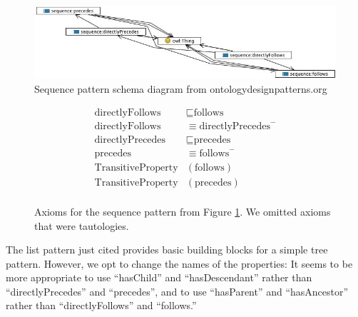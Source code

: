 \begin{figure}[t]
\begin{center}
\includegraphics[width=\textwidth]{sequence.png}
\end{center}
\caption{Sequence pattern schema diagram from ontologydesignpatterns.org}\label{fig:sequence}
\end{figure}

\begin{figure}[t]
\begin{align*}
\text{directlyFollows} &\sqsubseteq  \text{follows}\\
\text{directlyFollows} &\equiv  \text{directlyPrecedes}^- \\
\text{directlyPrecedes} &\sqsubseteq  \text{precedes}\\
\text{precedes} &\equiv  \text{follows}^- \\
\text{TransitiveProperty}&(\text{follows})\\
\text{TransitiveProperty}&(\text{precedes})\\
\end{align*}
\caption{Axioms for the sequence pattern from Figure \ref{fig:sequence}. We omitted axioms that were tautologies.}\label{fig:sequenceAxioms}
\end{figure}

The list pattern just cited provides basic building blocks for a simple tree pattern. However, we opt to change the names of the properties: It seems to be more appropriate to use ``hasChild'' and ``hasDescendant'' rather than ``directlyPrecedes'' and ``precedes'', and to use ``hasParent'' and ``hasAncestor'' rather than ``directlyFollows'' and ``follows.''

